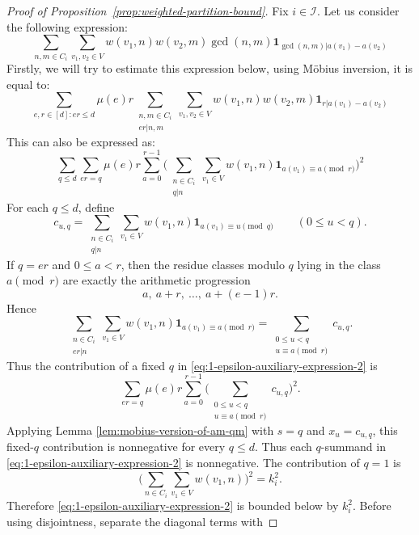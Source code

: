 \documentclass[11pt]{amsart}
\theoremstyle{remark}
\begin{document}
\begin{proof}[Proof of Proposition~\ref{prop:weighted-partition-bound}]
  Fix $i\in\mathcal I$.
  Let us consider the following expression:
  \begin{equation} \label{eq:1-epsilon-auxiliary-expression}
    \sum_{n, m \in C_i} \sum_{v_1, v_2 \in V} w(v_1, n) w(v_2, m) \gcd(n, m) \mathbf{1}_{\gcd(n,m) | a(v_1) - a(v_2)}
  \end{equation}
  Firstly, we will try to estimate this expression below, using M\"obius inversion, it is equal to:
  \begin{equation} 
    \sum_{e,r \in [d] : er \leq d} \mu(e) r \sum_{\substack{n, m \in C_i \\ er | n,m}} \sum_{v_1, v_2 \in V} w(v_1, n) w(v_2, m) \mathbf{1}_{r | a(v_1) - a(v_2)}
  \end{equation}
  This can also be expressed as:
  \begin{equation} \label{eq:1-epsilon-auxiliary-expression-2}
    \sum_{q\le d}\sum_{er=q}\mu(e)r\sum_{a=0}^{r-1}\Biggl( \sum_{\substack{n \in C_i \\ q | n}} \sum_{v_1 \in V} w(v_1, n) \mathbf{1}_{a(v_1) \equiv a \pmod r} \Biggr)^2
  \end{equation}
  For each $q\le d$, define
  \[
    c_{u,q}=\sum_{\substack{n \in C_i \\ q | n}} \sum_{v_1 \in V} w(v_1, n)\mathbf{1}_{a(v_1)\equiv u \pmod q}
    \qquad (0\le u<q).
  \]
  If $q=er$ and $0\le a<r$, then the residue classes modulo $q$ lying in the class $a \pmod r$ are exactly the arithmetic progression
  \[
    a,\ a+r,\ \ldots,\ a+(e-1)r.
  \]
  Hence
  \[
    \sum_{\substack{n \in C_i \\ er | n}} \sum_{v_1 \in V} w(v_1,n)\mathbf{1}_{a(v_1)\equiv a \pmod r}
    =\sum_{\substack{0\le u<q\\ u\equiv a \pmod r}} c_{u,q}.
  \]
  Thus the contribution of a fixed $q$ in \eqref{eq:1-epsilon-auxiliary-expression-2} is
  \[
    \sum_{er=q}\mu(e)r\sum_{a=0}^{r-1}\Biggl(\sum_{\substack{0\le u<q\\ u\equiv a \pmod r}} c_{u,q}\Biggr)^2.
  \]
  Applying Lemma \ref{lem:mobius-version-of-am-qm} with $s=q$ and $x_u=c_{u,q}$, this fixed-$q$ contribution is nonnegative for every $q\le d$. Thus each $q$-summand in \eqref{eq:1-epsilon-auxiliary-expression-2} is nonnegative. The contribution of $q=1$ is
  \[
    \Biggl( \sum_{n \in C_i} \sum_{v_1 \in V} w(v_1,n) \Biggr)^2=k_i^2.
  \]
  Therefore \eqref{eq:1-epsilon-auxiliary-expression-2} is bounded below by
  $k_i^2$.  Before using disjointness, separate the diagonal terms with

\end{proof}
\end{document}
